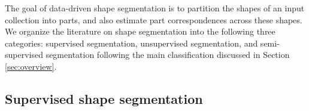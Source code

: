 The goal of data-driven shape segmentation is to partition the shapes of an input collection into parts, and also estimate part correspondences across these shapes. We organize the literature on shape segmentation into the following three categories: supervised segmentation, unsupervised segmentation, and semi-supervised segmentation following the main classification discussed in Section \ref{sec:overview}. 





\subsection{Supervised shape segmentation}

